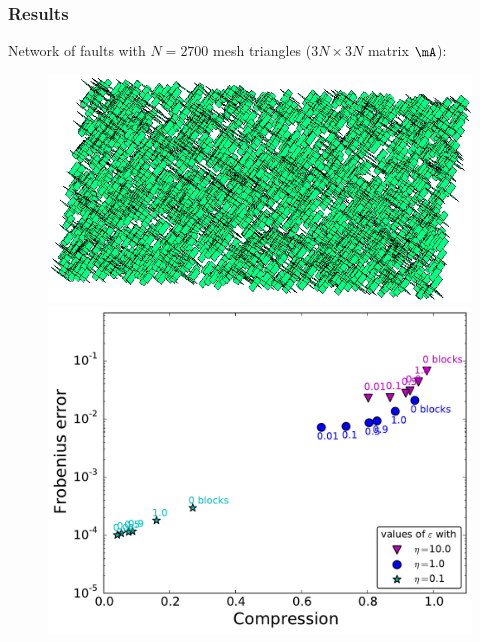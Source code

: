 \begin{frame}
\frametitle{Results}

\small

Network of \alert{faults} with $N=2700$ mesh triangles ($3N\times 3N$ matrix $\mA$):
\vspace{-5pt}
\begin{figure}
\centering
\begin{minipage}[c]{.49\linewidth}
\includegraphics[width=\textwidth]{../images/visu_maillage2700FracsV2D2.png}
\end{minipage}
\begin{minipage}[c]{.49\linewidth}
\includegraphics[width=\textwidth]{../images/graphe_compare_output_compression_18_08_2016matrice2700FracsV2D2.pdf}
\end{minipage}
\end{figure}

\end{frame}

